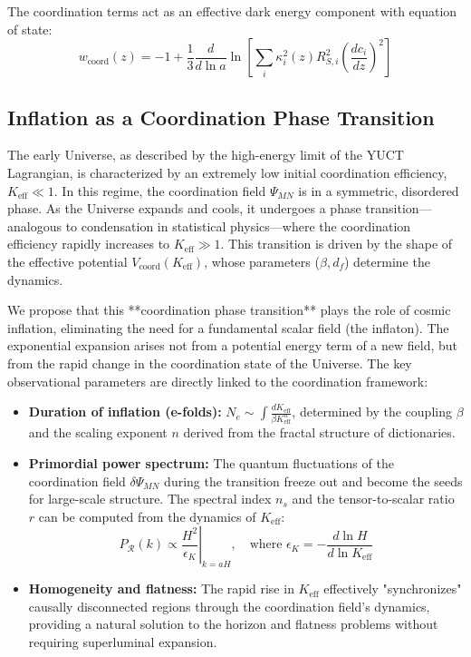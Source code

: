 \documentclass[11pt,a4paper]{article}
\begin{document}
	The coordination terms act as an effective dark energy component with equation of state:
	\begin{equation}
		w_{\text{coord}}(z) = -1 + \frac{1}{3} \frac{d}{d\ln a} \ln \left[ \sum_i \kappa_i^2(z) R_{S,i}^2 \left(\frac{dc_i}{dz}\right)^2 \right]
	\end{equation}
	
	
	\subsection{Inflation as a Coordination Phase Transition}
	\label{subsec:inflation-transition}
	
	The early Universe, as described by the high-energy limit of the YUCT Lagrangian, is characterized by an extremely low initial coordination efficiency, \(K_{\mathrm{eff}} \ll 1\). In this regime, the coordination field \(\Psi_{MN}\) is in a symmetric, disordered phase. As the Universe expands and cools, it undergoes a phase transition—analogous to condensation in statistical physics—where the coordination efficiency rapidly increases to \(K_{\mathrm{eff}} \gg 1\). This transition is driven by the shape of the effective potential \(V_{\mathrm{coord}}(K_{\mathrm{eff}})\), whose parameters (\(\beta, d_f\)) determine the dynamics.
	
	We propose that this **coordination phase transition** plays the role of cosmic inflation, eliminating the need for a fundamental scalar field (the inflaton). The exponential expansion arises not from a potential energy term of a new field, but from the rapid change in the coordination state of the Universe. The key observational parameters are directly linked to the coordination framework:
	
	\begin{itemize}
		\item \textbf{Duration of inflation (e-folds):} \(N_e \sim \int \frac{dK_{\mathrm{eff}}}{\beta K_{\mathrm{eff}}^n} \), determined by the coupling \(\beta\) and the scaling exponent \(n\) derived from the fractal structure of dictionaries.
		\item \textbf{Primordial power spectrum:} The quantum fluctuations of the coordination field \(\delta \Psi_{MN}\) during the transition freeze out and become the seeds for large-scale structure. The spectral index \(n_s\) and the tensor-to-scalar ratio \(r\) can be computed from the dynamics of \(K_{\mathrm{eff}}\):
		\begin{equation}
			P_{\mathcal{R}}(k) \propto \left. \frac{H^2}{\epsilon_K} \right|_{k=aH}, \quad \text{where } \epsilon_K = -\frac{d\ln H}{d\ln K_{\mathrm{eff}}}
		\end{equation}
		\item \textbf{Homogeneity and flatness:} The rapid rise in \(K_{\mathrm{eff}}\) effectively "synchronizes" causally disconnected regions through the coordination field's dynamics, providing a natural solution to the horizon and flatness problems without requiring superluminal expansion.
	\end{itemize}
	
\end{document}
